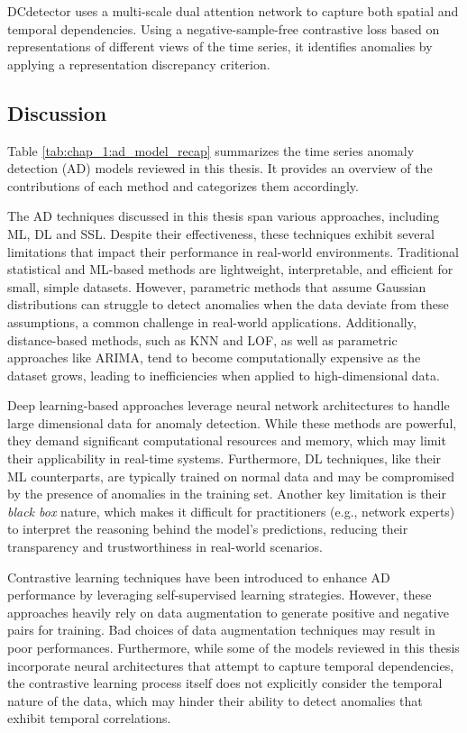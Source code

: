 DCdetector \cite{yang2023dcdetector} uses a multi-scale dual attention network to capture both spatial and temporal dependencies. Using a negative-sample-free contrastive loss based on representations of different views of the time series, it identifies anomalies by applying a representation discrepancy criterion.



\subsection{Discussion}

Table \ref{tab:chap_1:ad_model_recap} summarizes the time series anomaly detection (AD) models reviewed in this thesis. It provides an overview of the contributions of each method and categorizes them accordingly.

The AD techniques discussed in this thesis span various approaches, including ML, DL and SSL. Despite their effectiveness, these techniques exhibit several limitations that impact their performance in real-world environments. Traditional statistical and ML-based methods are lightweight, interpretable, and efficient for small, simple datasets. However, parametric methods that assume Gaussian distributions can struggle to detect anomalies when the data deviate from these assumptions, a common challenge in real-world applications. Additionally, distance-based methods, such as KNN and LOF, as well as parametric approaches like ARIMA, tend to become computationally expensive as the dataset grows, leading to inefficiencies when applied to high-dimensional data.

Deep learning-based approaches leverage neural network architectures to handle large dimensional data for anomaly detection. While these methods are powerful, they demand significant computational resources and memory, which may limit their applicability in real-time systems. Furthermore, DL techniques, like their ML counterparts, are typically trained on normal data and may be compromised by the presence of anomalies in the training set. Another key limitation is their \textit{black box} nature, which makes it difficult for practitioners (e.g., network experts) to interpret the reasoning behind the model's predictions, reducing their transparency and trustworthiness in real-world scenarios.

Contrastive learning techniques have been introduced to enhance AD performance by leveraging self-supervised learning strategies. However, these approaches heavily rely on data augmentation to generate positive and negative pairs for training. Bad choices of data augmentation techniques may result in poor performances. Furthermore, while some of the models reviewed in this thesis incorporate neural architectures that attempt to capture temporal dependencies, the contrastive learning process itself does not explicitly consider the temporal nature of the data, which may hinder their ability to detect anomalies that exhibit temporal correlations.

